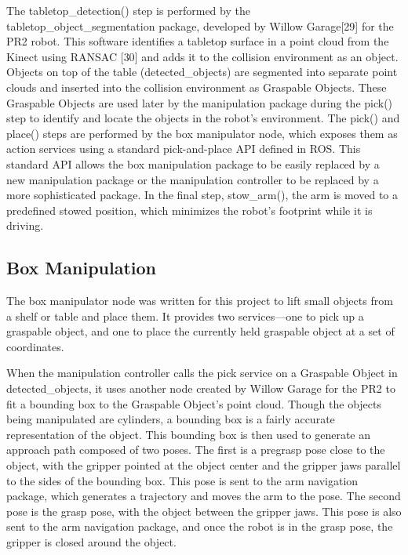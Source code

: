 \documentclass[]{cwru} %
\begin{document}
The tabletop\_detection() step is performed by the
tabletop\_object\_segmentation package, developed by Willow
Garage{[}29{]} for the PR2 robot. This software identifies a tabletop
surface in a point cloud from the Kinect using RANSAC {[}30{]} and adds
it to the collision environment as an object. Objects on top of the
table (detected\_objects) are segmented into separate point clouds and
inserted into the collision environment as Graspable Objects. These
Graspable Objects are used later by the manipulation package during the
pick() step to identify and locate the objects in the robot's
environment. The pick() and place() steps are performed by the box
manipulator node, which exposes them as action services using a standard
pick-and-place API defined in ROS. This standard API allows the box
manipulation package to be easily replaced by a new manipulation package
or the manipulation controller to be replaced by a more sophisticated
package. In the final step, stow\_arm(), the arm is moved to a
predefined stowed position, which minimizes the robot's footprint while
it is driving.

\subsection{Box Manipulation}

The box manipulator node was written for this project to lift small
objects from a shelf or table and place them. It provides two
services---one to pick up a graspable object, and one to place the
currently held graspable object at a set of coordinates.

When the manipulation controller calls the pick service on a Graspable
Object in detected\_objects, it uses another node created by Willow
Garage for the PR2 to fit a bounding box to the Graspable Object's point
cloud. Though the objects being manipulated are cylinders, a bounding
box is a fairly accurate representation of the object. This bounding box
is then used to generate an approach path composed of two poses. The
first is a pregrasp pose close to the object, with the gripper pointed
at the object center and the gripper jaws parallel to the sides of the
bounding box. This pose is sent to the arm navigation package, which
generates a trajectory and moves the arm to the pose. The second pose is
the grasp pose, with the object between the gripper jaws. This pose is
also sent to the arm navigation package, and once the robot is in the
grasp pose, the gripper is closed around the object.
\end{document}
